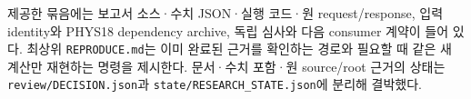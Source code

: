 제공한 묶음에는 보고서 소스·수치 JSON·실행 코드·원 request/response,
입력 identity와 PHYS18 dependency archive, 독립 심사와
다음 consumer 계약이 들어 있다.
최상위 \texttt{REPRODUCE.md}는 이미 완료된 근거를 확인하는 경로와
필요할 때 같은 새 계산만 재현하는 명령을 제시한다.
문서·수치 포함·원 source/root 근거의 상태는
\texttt{review/DECISION.json}과 \texttt{state/RESEARCH\_STATE.json}에 분리해 결박했다.
